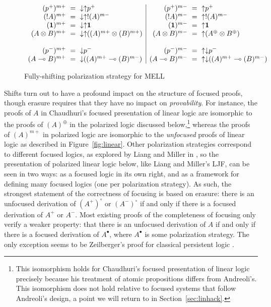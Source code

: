 \begin{figure}
{\small \[
\begin{array}{rcl|rcl}
(p^+)^{m+} & \!\!\!=\!\!\! & {\downarrow}{\uparrow}p^+ &
(p^+)^{m-} & \!\!\!=\!\!\! & {\uparrow}p^+
\\
({!}A)^{m+} & \!\!\!=\!\!\! & {\downarrow}{\uparrow}{!}(A)^{m-} &
({!}A)^{m-} & \!\!\!=\!\!\! & {\uparrow}{!}(A)^{m-}
\\
(\one)^{m+} & \!\!\!=\!\!\! & {\downarrow}{\uparrow}\one &
(\one)^{m-} & \!\!\!=\!\!\! & {\uparrow}\one 
\\
(A \otimes B)^{m+} & \!\!\!=\!\!\!
    & {\downarrow}{\uparrow}((A)^{m+} \otimes (B)^{m+}) &
(A \otimes B)^{m-} & \!\!\!=\!\!\! & {\uparrow}(A^\oplus \otimes B^\oplus)
\\
& & & & & 
\\
(p^-)^{m+} & \!\!\!=\!\!\! & {\downarrow}p^- &
(p^-)^{m-} & \!\!\!=\!\!\! & {\uparrow}{\downarrow}p^- 
\\
(A \lolli B)^{m+} & \!\!\!=\!\!\! & {\downarrow}((A)^{m+} \lolli (B)^{m-}) &
(A \lolli B)^{m-} & \!\!\!=\!\!\!
     & {\uparrow}{\downarrow}((A)^{m+} \lolli (B)^{m-})
\end{array}
\]}

\caption{Fully-shifting polarization strategy for MELL}
\label{fig:lin-maxshift}
\end{figure}

Shifts turn out to have a profound impact on the structure of focused
proofs, though erasure requires that they have no impact on {\it
  provability}. For instance, the proofs of $A$ in Chaudhuri's focused
presentation of linear logic are isomorphic to the proofs of
$(A)^\oplus$ in the polarized logic discussed below,\footnote{This
  isomorphism holds for Chaudhuri's focused presentation of linear
  logic precisely because his treatment of atomic propositions differs
  from Andreoli's. This isomorphism does not hold relative to focused
  systems that follow Andreoli's design, a point we will return to in
  Section~\ref{sec:linhack}.} whereas the proofs of $(A)^{m+}$ in
polarized logic are isomorphic to the {\it unfocused} proofs of linear
logic as described in Figure~\ref{fig:linear}. Other polarization
strategies correspond to different focused logics, as explored by
Liang and Miller in \cite{liang09focusing}, so the presentation of
polarized linear logic below, like Liang and Miller's LJF, can be seen
in two ways: as a focused logic in its own right, and as a framework
for defining many focused logics (one per polarization strategy). As
such, the strongest statement of the correctness of focusing is based
on erasure: there is an unfocused derivation of $(A^+)^\circ$ or
$(A^-)^\circ$ if and only if there is a focused derivation of $A^+$ or
$A^-$.  Most existing proofs of the completeness of focusing only
verify a weaker property: that there is an unfocused derivation of $A$
if and only if there is a focused derivation of $A^\bullet$, where
$A^\bullet$ is some polarization strategy.  The only exception seems
to be Zeilberger's proof for classical persistent logic
\cite{zeilberger08unity}.

